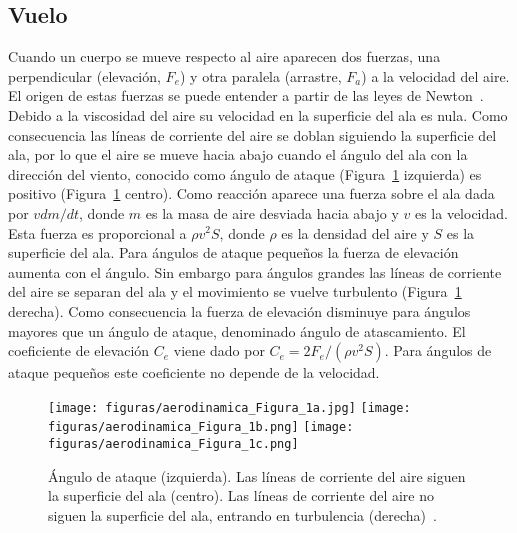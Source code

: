 \documentclass[11pt]{articulo}
\begin{document}
\subsection{Vuelo}

Cuando un cuerpo se mueve respecto al aire aparecen dos fuerzas, una perpendicular (elevaci\'on, $F_e$) y otra paralela (arrastre, $F_a$) a la velocidad del aire. El origen de estas fuerzas se puede entender a partir de las leyes de Newton~\cite{anderson}. Debido a la viscosidad del aire su velocidad en la superficie del ala es nula. Como consecuencia las l\'ineas de corriente del aire se doblan siguiendo la superficie del ala, por lo que el aire se mueve hacia abajo cuando el \'angulo del ala con la direcci\'on del viento, conocido como \'angulo de ataque (Figura~\ref{aerofoil} izquierda) es positivo (Figura~\ref{aerofoil} centro). Como reacci\'on aparece una fuerza sobre el ala dada por $vdm/dt$, donde $m$ es la masa de aire desviada hacia abajo y $v$ es la velocidad. Esta fuerza es proporcional a $\rho v^2S$, donde $\rho$ es la densidad del aire y $S$ es la superficie del ala. Para \'angulos de ataque peque\~nos la fuerza de elevaci\'on aumenta con el \'angulo. Sin embargo para \'angulos grandes las l\'ineas de corriente del aire se separan del ala y el movimiento se vuelve turbulento (Figura~\ref{aerofoil} derecha). Como consecuencia la fuerza de elevaci\'on disminuye para \'angulos mayores que un \'angulo de ataque, denominado \'angulo de atascamiento. El coeficiente de elevaci\'on $C_e$ viene dado por $C_e = 2 F_e / (\rho v^2 S)$. Para \'angulos de ataque peque\~nos este coeficiente no depende de la velocidad.
%
\begin{figure}[htb]
\begin{center}
\hspace*{0.0cm}
\texttt{[image: figuras/aerodinamica\_Figura\_1a.jpg]}
\texttt{[image: figuras/aerodinamica\_Figura\_1b.png]}
\texttt{[image: figuras/aerodinamica\_Figura\_1c.png]}
\end{center}
\vspace*{-0.6cm}
\caption[]{\label{aerofoil}
{\'Angulo de ataque (izquierda). Las l\'ineas de corriente del aire siguen la
superficie del ala (centro). Las l\'ineas de corriente del aire no siguen la
superficie del ala, entrando en turbulencia (derecha)~\cite{babinsky}.}}
\end{figure}


\end{document}
